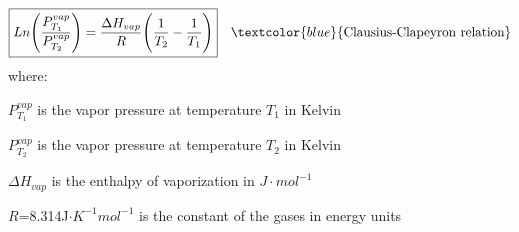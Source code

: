 \documentclass[main.tex]{subfiles}
\begin{document}
\begin{description}
\begin{equation*}
\boxed{  Ln\Bigg(\frac{P^{vap}_{T_1} }{P^{vap}_{T_2}}\Bigg)=\frac{\Delta H_{vap}}{R}\Bigg(\frac{1}{T_2}-\frac{1}{T_1}\Bigg)  } \quad \textcolor{blue}{\text{Clausius-Clapeyron relation}}
\end{equation*}
where:
\begin{where}
 \item $P^{vap}_{T_1}$  is the vapor pressure at temperature $T_1$ in Kelvin
 \item $P^{vap}_{T_2}$  is the vapor pressure at temperature $T_2$ in Kelvin
  \item $\Delta H_{vap}$ is the enthalpy of vaporization in $J\cdot mol^{-1}$
  \item $R$=8.314J$\cdot K^{-1} mol^{-1}$ is the constant of the gases in energy units
\end{where}




\end{description}
\end{document}
